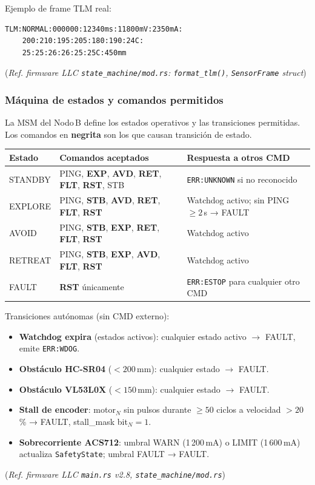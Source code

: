 Ejemplo de frame TLM real:
\begin{verbatim}
TLM:NORMAL:000000:12340ms:11800mV:2350mA:
    200:210:195:205:180:190:24C:
    25:25:26:26:25:25C:450mm
\end{verbatim}
(\emph{Ref. firmware LLC \texttt{state\_machine/mod.rs}: \texttt{format\_tlm()}, \texttt{SensorFrame} struct})

\subsubsection{Máquina de estados y comandos permitidos}

La MSM del Nodo\,B define los estados operativos y las transiciones
permitidas. Los comandos en \textbf{negrita} son los que causan
transición de estado.

\begin{center}
\small
\renewcommand{\arraystretch}{1.3}
\begin{tabular}{lp{4.5cm}p{5.0cm}}
\toprule
\textbf{Estado} & \textbf{Comandos aceptados} & \textbf{Respuesta a otros CMD} \\
\midrule
STANDBY &
  PING, \textbf{EXP}, \textbf{AVD}, \textbf{RET}, \textbf{FLT}, \textbf{RST}, STB &
  \verb|ERR:UNKNOWN| si no reconocido \\
EXPLORE &
  PING, \textbf{STB}, \textbf{AVD}, \textbf{RET}, \textbf{FLT}, \textbf{RST} &
  Watchdog activo; sin PING $\geq 2$\,s → FAULT \\
AVOID   &
  PING, \textbf{STB}, \textbf{EXP}, \textbf{RET}, \textbf{FLT}, \textbf{RST} &
  Watchdog activo \\
RETREAT &
  PING, \textbf{STB}, \textbf{EXP}, \textbf{AVD}, \textbf{FLT}, \textbf{RST} &
  Watchdog activo \\
FAULT   &
  \textbf{RST} únicamente &
  \verb|ERR:ESTOP| para cualquier otro CMD \\
\bottomrule
\end{tabular}
\end{center}

Transiciones autónomas (sin CMD externo):
\begin{itemize}
  \item \textbf{Watchdog expira} (estados activos): cualquier estado activo $\rightarrow$ FAULT,
        emite \verb|ERR:WDOG|.
  \item \textbf{Obstáculo HC-SR04} ($< 200$\,mm): cualquier estado $\rightarrow$ FAULT.
  \item \textbf{Obstáculo VL53L0X} ($< 150$\,mm): cualquier estado $\rightarrow$ FAULT.
  \item \textbf{Stall de encoder}: motor$_N$ sin pulsos durante $\geq 50$ ciclos a
        velocidad $> 20$\,\% → FAULT, stall\_mask bit$_N = 1$.
  \item \textbf{Sobrecorriente ACS712}: umbral WARN (1\,200\,mA) o
        LIMIT (1\,600\,mA) actualiza \verb|SafetyState|; umbral FAULT → FAULT.
\end{itemize}
(\emph{Ref. firmware LLC \texttt{main.rs} v2.8, \texttt{state\_machine/mod.rs}})

